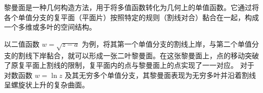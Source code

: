 \begin{definition}[黎曼面]
黎曼面是一种几何构造方法，用于将多值函数转化为几何上的单值函数。它通过将各个单值分支的复平面（平面片）按照特定的规则（割线对合）黏合在一起，构成一个多维或多叶的空间结构。
\end{definition}

\begin{remark}[构造与属性]
以二值函数 \(w = \sqrt{z-a}\) 为例，将其第一个单值分支的割线上岸，与第二个单值分支的割线下岸黏合，就可以形成一张二叶黎曼面。在这张黎曼面上，点的移动突破了原复平面上割线的限制，复平面内的点与黎曼面上的点实现了一一对应。
对于对数函数 \(w = \ln z\) 及其无穷多个单值分支，其黎曼面表现为无穷多叶并沿着割线呈螺旋状上升的复杂曲面。
\end{remark}


